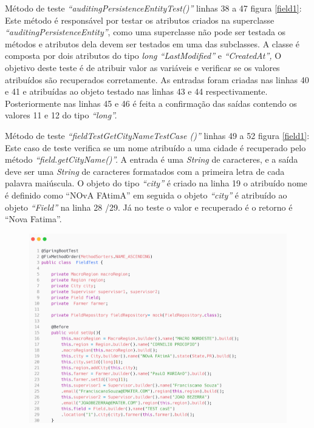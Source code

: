 Método de teste\textit{ “auditingPersistenceEntityTest()”} linhas 38 a 47 figura \ref{field1}: Este método é responsável por testar os atributos criados na superclasse\textit{ “auditingPersistenceEntity”}, como uma superclasse não pode ser testada os métodos e atributos dela devem ser testados em uma das subclasses.  A classe é composta por dois atributos do tipo \textit{long “LastModified”} e \textit{“CreatedAt”,} O objetivo deste teste é de atribuir valor as variáveis e verificar se os valores atribuídos são recuperados corretamente. As entradas foram criadas nas linhas 40 e 41 e atribuídas ao objeto testado nas linhas 43 e 44 respectivamente. Posteriormente nas linhas 45 e 46 é feita a confirmação das saídas contendo os valores 11 e 12 do tipo \textit{“long”.}

Método de teste \textit{“fieldTestGetCityNameTestCase ()”} linhas 49 a 52 figura \ref{field1}: Este caso de teste verifica se um nome atribuído a uma cidade é recuperado pelo método \textit{“field.getCityName()”.} A entrada é uma \textit{String} de caracteres, e a saída deve ser uma \textit{String} de caracteres formatados com a primeira letra de cada palavra maiúscula.  O objeto do tipo \textit{“city” }é criado na linha 19 o atribuído nome é definido como “NOvA FAtimA” em seguida o objeto\textit{ “city”} é atribuído ao objeto\textit{ “Field” }na linha 28 /29. Já no teste o valor e recuperado é o retorno é “Nova Fatima”.


\begin{figure}[H]
	\centering  
	\includegraphics[scale=0.18]{dados/figuras/buildTestField.png}
\end{figure}


